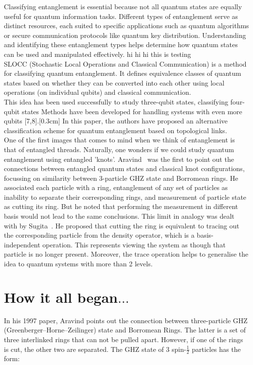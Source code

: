 \documentclass{scrartcl}
\begin{document}
Classifying entanglement is essential because not all quantum states are equally useful for quantum information tasks. Different types of entanglement serve as distinct resources, each suited to specific applications such as quantum algorithms or secure communication protocols like quantum key distribution. Understanding and identifying these entanglement types helps determine how quantum states can be used and manipulated effectively. hi hi hi this is testing\\[0.3cm]
SLOCC (Stochastic Local Operations and Classical Communication) is a method for classifying quantum entanglement. It defines equivalence classes of quantum states based on whether they can be converted into each other using local operations (on individual qubits) and classical communication.\\[0.3cm]
This idea has been used successfully to study three-qubit states, classifying four-qubit states Methods have been developed for handling systems with even more qubits [7,8].[0.3cm]
In this paper, the authors have proposed an alternative classification scheme for quantum entanglement based on topological links.\\[0.3cm]
One of the first images that comes to mind when we think of entanglement is that of entangled threads. Naturally, one wonders if we could study quantum entanglement using entangled 'knots'. Aravind~\cite{Aravind1997} was the first to point out the connections between entangled quantum states and classical knot configurations, focussing on similarity between 3-particle GHZ state and Borromean rings. He associated each particle with a ring, entanglement of any set of particles as inability to separate their corresponding rings, and measurement of particle state as cutting its ring. But he noted that performing the measurement in different basis would not lead to the same conclusions. This limit in analogy was dealt with by Sugita~\cite{Sugita2007-ko}. He proposed that cutting the ring is equivalent to tracing out the corresponding particle from the density operator, which is a basis-independent operation. This represents viewing the system as though that particle is no longer present. Moreover, the trace operation helps to generalise the idea to quantum systems with more than 2 levels.  

\section{How it all began$\ldots$}
In his 1997 paper, Aravind points out the connection between three-particle GHZ (Greenberger–Horne–Zeilinger)
state and Borromean Rings. The latter is a set of three interlinked rings that can not be pulled apart. However, if one of the rings is cut, the other two are separated. The GHZ state of 3 spin-$\frac{1}{2}$ particles has the form:
\end{document}
